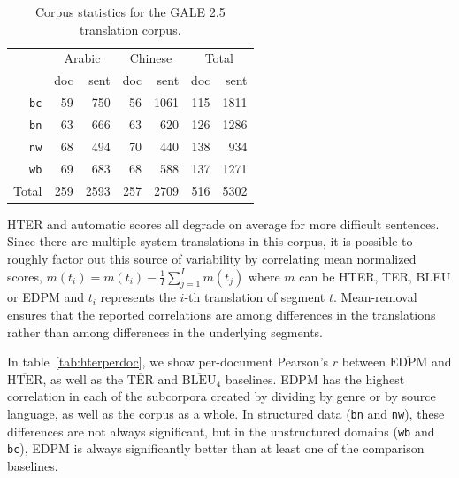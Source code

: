 \documentclass{kluwer}    %
\begin{document}
\begin{article}
\begin{table}
  \begin{tabular}{r|rr|rr|rr}
    \hline
     & \multicolumn{2}{c|}{Arabic} & \multicolumn{2}{c|}{Chinese}
     & \multicolumn{2}{c}{Total}\\
     & doc & sent & doc & sent & doc   & sent\\
     \hline
     \texttt{bc}    & 59  & 750 & 56 & 1061 & 115 & 1811\\
     \texttt{bn}    & 63  & 666 & 63 & 620  & 126 & 1286\\
     \texttt{nw}    & 68  & 494 & 70 & 440  & 138 & 934 \\
     \texttt{wb}    & 69  & 683 & 68 & 588  & 137 & 1271\\
     \hline
     Total & 259 & 2593& 257& 2709 & 516 & 5302\\
     \hline
  \end{tabular}
  \caption{Corpus statistics for the GALE 2.5 translation
    corpus.}
  \label{tab:galestats}
\end{table}

HTER and automatic scores all degrade on average for more difficult sentences.
Since there are multiple system translations in this corpus, it is possible to 
roughly factor out this source of variability by correlating mean normalized
scores,
$\overline{m}(t_i) = m(t_i) - \frac{1}{I}\sum_{j=1}^Im(t_j)$
where $m$ can be HTER, TER, BLEU or EDPM and $t_i$
represents the $i$-th translation of segment $t$.
Mean-removal ensures
that the reported correlations are among differences in the
translations rather than among differences in the underlying segments.

In table~\ref{tab:hterperdoc}, we show per-document Pearson's $r$
between $\overline{\textrm{EDPM}}$ and $\overline{\textrm{HTER}}$, as well as the $\overline{\textrm{TER}}$ and $\overline{\textrm{BLEU}}$$_4$
baselines. EDPM has the highest correlation in each of the
subcorpora created by dividing by genre or by source language, as well
as the corpus as a whole.   In structured data
(\texttt{bn} and \texttt{nw}), these differences are not always
significant, but in the unstructured domains (\texttt{wb} and
\texttt{bc}), EDPM is always significantly better than at least one of
the comparison baselines.


\end{article}
\end{document}
